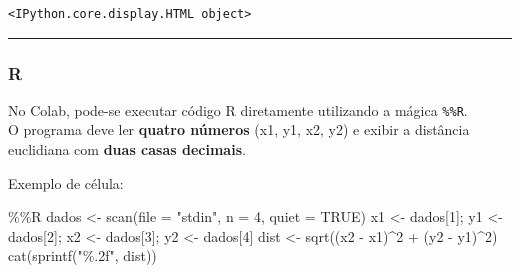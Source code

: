 \documentclass[
  portuguese,
  letterpaper,
  openany,
  oneside,
  12pt,
  a4paper]{book}
\newenvironment{Shaded}{\begin{snugshade}}{\end{snugshade}}
\newcommand{\AttributeTok}[1]{\textcolor[rgb]{0.40,0.45,0.13}{#1}}
\newcommand{\ConstantTok}[1]{\textcolor[rgb]{0.56,0.35,0.01}{#1}}
\newcommand{\DecValTok}[1]{\textcolor[rgb]{0.68,0.00,0.00}{#1}}
\newcommand{\FunctionTok}[1]{\textcolor[rgb]{0.28,0.35,0.67}{#1}}
\newcommand{\NormalTok}[1]{\textcolor[rgb]{0.00,0.23,0.31}{#1}}
\newcommand{\OtherTok}[1]{\textcolor[rgb]{0.00,0.23,0.31}{#1}}
\newcommand{\SpecialCharTok}[1]{\textcolor[rgb]{0.37,0.37,0.37}{#1}}
\newcommand{\StringTok}[1]{\textcolor[rgb]{0.13,0.47,0.30}{#1}}
\begin{document}
\begin{verbatim}
<IPython.core.display.HTML object>
\end{verbatim}

\begin{center}\rule{0.5\linewidth}{0.5pt}\end{center}

\subsubsection{\texorpdfstring{ R}{ R}}\label{r}

No Colab, pode-se executar código R diretamente utilizando a mágica
\texttt{\%\%R}.\\
O programa deve ler \textbf{quatro números} (x1, y1, x2, y2) e exibir a
distância euclidiana com \textbf{duas casas decimais}.

Exemplo de célula:

\begin{Shaded}
\begin{Highlighting}[]
\SpecialCharTok{\%\%}\NormalTok{R}
\NormalTok{dados }\OtherTok{\textless{}{-}} \FunctionTok{scan}\NormalTok{(}\AttributeTok{file =} \StringTok{"stdin"}\NormalTok{, }\AttributeTok{n =} \DecValTok{4}\NormalTok{, }\AttributeTok{quiet =} \ConstantTok{TRUE}\NormalTok{)}
\NormalTok{x1 }\OtherTok{\textless{}{-}}\NormalTok{ dados[}\DecValTok{1}\NormalTok{]; y1 }\OtherTok{\textless{}{-}}\NormalTok{ dados[}\DecValTok{2}\NormalTok{]; x2 }\OtherTok{\textless{}{-}}\NormalTok{ dados[}\DecValTok{3}\NormalTok{]; y2 }\OtherTok{\textless{}{-}}\NormalTok{ dados[}\DecValTok{4}\NormalTok{]}
\NormalTok{dist }\OtherTok{\textless{}{-}} \FunctionTok{sqrt}\NormalTok{((x2 }\SpecialCharTok{{-}}\NormalTok{ x1)}\SpecialCharTok{\^{}}\DecValTok{2} \SpecialCharTok{+}\NormalTok{ (y2 }\SpecialCharTok{{-}}\NormalTok{ y1)}\SpecialCharTok{\^{}}\DecValTok{2}\NormalTok{)}
\FunctionTok{cat}\NormalTok{(}\FunctionTok{sprintf}\NormalTok{(}\StringTok{"\%.2f"}\NormalTok{, dist))}
\end{Highlighting}
\end{Shaded}
\end{document}
